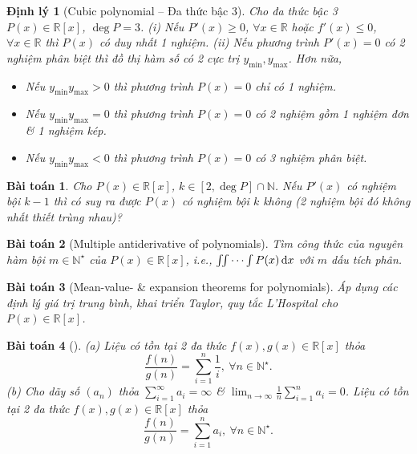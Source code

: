 \documentclass{article}
\newtheorem{baitoan}{Bài toán}
\newtheorem{dinhly}{Định lý}
\begin{document}
\begin{dinhly}[Cubic polynomial -- Đa thức bậc 3]
	Cho đa thức bậc 3 $P(x)\in\mathbb{R}[x]$, $\deg P = 3$. (i) Nếu $P'(x)\ge0$, $\forall x\in\mathbb{R}$ hoặc $f'(x)\le0$, $\forall x\in\mathbb{R}$ thì $P(x)$ có duy nhất 1 nghiệm. (ii) Nếu phương trình $P'(x) = 0$ có 2 nghiệm phân biệt thì đồ thị hàm số có 2 cực trị $y_{\min},y_{\max}$. Hơn nữa,
	\begin{itemize}
		\item Nếu $y_{\min}y_{\max} > 0$ thì phương trình $P(x) = 0 $ chỉ có 1 nghiệm.
		\item Nếu $y_{\min}y_{\max} = 0$ thì phương trình $P(x) = 0 $ có 2 nghiệm gồm 1 nghiệm đơn \& 1 nghiệm kép.
		\item Nếu $y_{\min}y_{\max} < 0$ thì phương trình $P(x) = 0 $ có 3 nghiệm phân biệt.
	\end{itemize}
\end{dinhly}

\begin{baitoan}
	Cho $P(x)\in\mathbb{R}[x]$, $k\in[2,\deg P]\cap\mathbb{N}$. Nếu $P'(x)$ có nghiệm bội $k - 1$ thì có suy ra được $P(x)$ có nghiệm bội $k$ không (2 nghiệm bội đó không nhất thiết trùng nhau)?
\end{baitoan}

\begin{baitoan}[Multiple antiderivative of polynomials]
	Tìm công thức của nguyên hàm bội $m\in\mathbb{N}^\star$ của $P(x)\in\mathbb{R}[x]$, i.e., $\iint\cdots\int P(x)\,{\rm d}x$ với $m$ dấu tích phân.
\end{baitoan}

\begin{baitoan}[Mean-value- \& expansion theorems for polynomials]
	Áp dụng các định lý giá trị trung bình, khai triển Taylor, quy tắc L'Hospital cho $P(x)\in\mathbb{R}[x]$.
\end{baitoan}

\begin{baitoan}[\cite{Quoc_Long_Dat_Nam_VMC}]
	(a) Liệu có tồn tại 2 đa thức $f(x),g(x)\in\mathbb{R}[x]$ thỏa
	\begin{equation*}
		\frac{f(n)}{g(n)} = \sum_{i=1}^n \frac{1}{i},\ \forall n\in\mathbb{N}^\star.
	\end{equation*}
	(b) Cho dãy số $(a_n)$ thỏa $\sum_{i=1}^\infty a_i = \infty$ \& $\lim_{n\to\infty} \frac{1}{n}\sum_{i=1}^n a_i = 0$. Liệu có tồn tại 2 đa thức $f(x),g(x)\in\mathbb{R}[x]$ thỏa
	\begin{equation*}
		\frac{f(n)}{g(n)} = \sum_{i=1}^n a_i,\ \forall n\in\mathbb{N}^\star.
	\end{equation*}
\end{baitoan}
\end{document}
